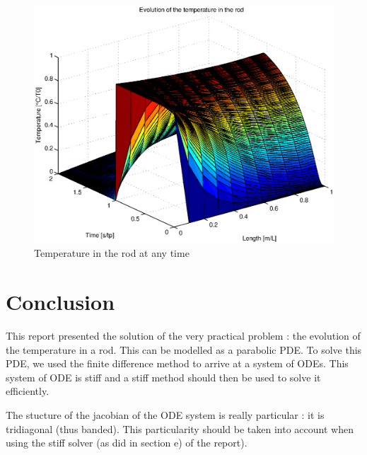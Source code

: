 \begin{figure}
\begin{center}
\includegraphics[scale=0.5]{stable.eps}
\caption{Temperature in the rod at any time}
\label{stable}
\end{center}
\end{figure}

\section*{Conclusion}
This report presented the solution of the very practical problem : the evolution of the temperature in a rod. This can be modelled as a parabolic PDE. To solve this PDE, we used the finite difference method to arrive at a system of ODEs. This system of ODE is stiff and a stiff method should then be used to solve it efficiently.

The stucture of the jacobian of the ODE system is really particular : it is tridiagonal (thus banded). This particularity should be taken into account when using the stiff solver (as did in section e) of the report).